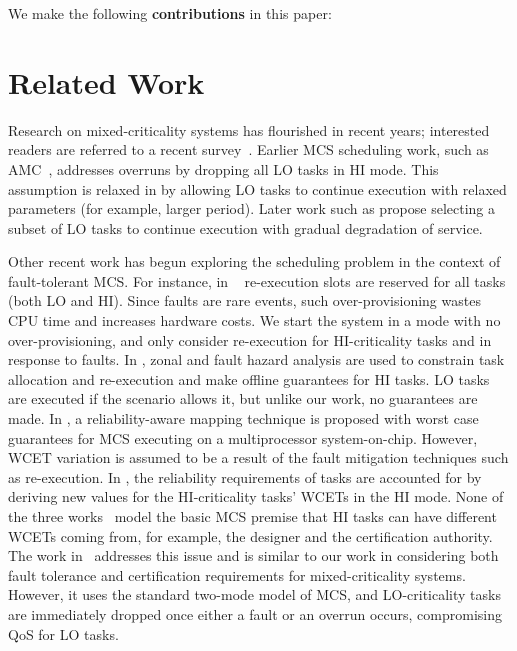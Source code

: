 \documentclass[conference]{IEEEtran}
\newcommand{\td}{\todo[inline]}
\begin{document}
	
We make the following {\bf contributions} in this paper:
\td{our contributions}


\section{Related Work}

Research on mixed-criticality systems has flourished in recent years; interested readers are referred to a recent survey~\cite{burns2013mixed}.
Earlier MCS scheduling work, such as AMC~\cite{baruah2011response}, addresses overruns by dropping all LO tasks in HI mode. This assumption is relaxed in \cite{burns2013towards} by allowing LO tasks to continue execution with relaxed parameters (for example, larger period). Later work such as \cite{importance14} propose selecting a subset of LO tasks to continue execution with gradual degradation of service.


Other recent work has begun exploring the scheduling problem in the context of fault-tolerant MCS. For instance, in ~\cite{lin2014scheduling} re-execution slots are reserved for all tasks (both LO and HI). Since faults are rare events, such over-provisioning wastes CPU time and increases hardware costs. We start the system in a mode with no over-provisioning, and only consider re-execution for HI-criticality tasks and in response to faults. In \cite{thekkilakattil2014mixed}, zonal and fault hazard analysis are used to constrain task allocation and re-execution and make offline guarantees for HI tasks. LO tasks are executed if the scenario allows it, but unlike our work, no guarantees are made. In \cite{kang2014static}, a reliability-aware mapping technique is proposed with worst case guarantees for MCS executing on a multiprocessor system-on-chip. However, WCET variation is assumed to be a result of the fault mitigation techniques such as re-execution. In \cite{huang2014scheduling}, the reliability requirements of tasks are accounted for by deriving new values for the HI-criticality tasks' WCETs in the HI mode. None of the three works~\cite{thekkilakattil2014mixed, kang2014static, huang2014scheduling} model the basic MCS premise that HI tasks can have different WCETs coming from, for example, the designer and the certification authority.
The work in~\cite{pathan14} addresses this issue and is similar to our work in considering both fault tolerance and certification requirements for mixed-criticality systems. However, it uses the standard two-mode model of MCS, and LO-criticality tasks are immediately dropped once either a fault or an overrun occurs, compromising QoS for LO tasks.
\end{document}
